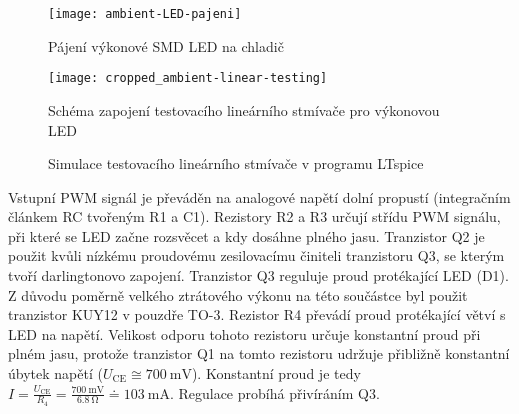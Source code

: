 \begin{figure}[htbp]
    \centering
    \texttt{[image: ambient-LED-pajeni]}
    \caption{Pájení výkonové SMD LED na chladič}
    \label{fig:ambient LED pajeni}
\end{figure}



\begin{figure}[htbp]
    \centering
    \texttt{[image: cropped\_ambient-linear-testing]}
    \caption{Schéma zapojení testovacího lineárního stmívače pro výkonovou LED}
    \label{fig:ambient linear testing sch}
\end{figure}

\begin{figure}[htbp]
    \centering
    \caption{Simulace testovacího lineárního stmívače v programu LTspice}
    \label{fig:ambient linear testing sim}
\end{figure}

Vstupní PWM signál je převáděn na analogové napětí dolní propustí (integračním
článkem RC tvořeným R1 a C1). Rezistory R2 a R3 určují střídu PWM
signálu, při které se LED začne rozsvěcet a kdy dosáhne plného jasu. Tranzistor
Q2 je použit kvůli nízkému proudovému zesilovacímu činiteli tranzistoru Q3, se
kterým tvoří darlingtonovo zapojení. Tranzistor Q3 reguluje proud protékající
LED (D1). Z důvodu poměrně velkého ztrátového výkonu na této součástce byl
použit tranzistor KUY12 v pouzdře TO-3. Rezistor R4 převádí proud protékající
větví s LED na napětí. Velikost odporu tohoto rezistoru určuje konstantní proud
při plném jasu, protože tranzistor Q1 na tomto rezistoru udržuje přibližně
konstantní úbytek napětí ($U_\mathrm{CE} \cong \SI{700}{\milli\volt}$).
Konstantní proud je tedy $I = \frac{U_\mathrm{CE}}{R_4} =
\frac{\SI{700}{\milli\volt}}{\SI{6,8}{\ohm}} \doteq \SI{103}{\milli\ampere}$.
Regulace probíhá přivíráním Q3.

\FloatBarrier
